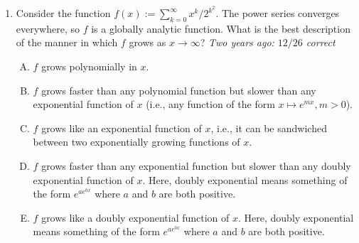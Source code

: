 \documentclass[10pt]{amsart}
\begin{document}
\begin{enumerate}
  \begin{enumerate}[(A)]
  \item If we start with any function in $C^\infty(\R)$ and take the
    Taylor series about $0$, the Taylor series converges everywhere on
    $\R$.
  \item If we start with any function in $C^\infty(\R)$ and take the
    Taylor series about $0$, the Taylor series converges to the
    original function on its interval of convergence (which may not be
    all of $\R$).
  \item If we start with a power series about $0$ that converges
    everywhere in $\R$, then the function it converges to is in
    $C^\infty(\R)$ and its Taylor series about $0$ equals the original
    power series.
  \item All of the above.
  \item None of the above.
  \end{enumerate}

  {\em Answer}: Option (C)

  {\em Explanation}: See the lecture notes. A counterexample to (A) is
  $\arctan$, and a counterexample to (B) is $e^{-1/x^2}$.

  {\em Performance review}: $17$ out of $24$ got this. $4$ chose (D),
  $2$ chose (B), $1$ chose (A).

  {\em Historical note (Math 153)}: $29$ out of $40$ got this. $6$ chose (D),
  $4$ chose (B), $1$ chose (A).

  {\em Historical note (last year)}: $9$ out of $11$ got this
  correct. $1$ chose (B) and $1$ chose (E).

  {\em Historical note (two years ago)}: $5$ out of $26$ people got this
  correct. $10$ chose (B), $5$ each chose (D) and (E), and $1$ chose
  (A).

\item Consider the function $f(x) := \sum_{k=0}^\infty
  x^k/2^{k^2}$. The power series converges everywhere, so $f$ is a
  globally analytic function. What is the best description of the
  manner in which $f$ grows as $x \to \infty$? {\em Two years ago: $12/26$
  correct}

  \begin{enumerate}[(A)]
  \item $f$ grows polynomially in $x$.
  \item $f$ grows faster than any polynomial function but slower than
    any exponential function of $x$ (i.e., any function of the form $x
    \mapsto e^{mx}, m >0$).
  \item $f$ grows like an exponential function of $x$, i.e., it can be
    sandwiched between two exponentially growing functions of $x$.
  \item $f$ grows faster than any exponential function but slower than
    any doubly exponential function of $x$. Here, doubly exponential
    means something of the form $e^{ae^{bx}}$ where $a$ and $b$ are
    both positive.
  \item $f$ grows like a doubly exponential function of $x$. Here,
    doubly exponential means something of the form $e^{ae^{bx}}$ where
    $a$ and $b$ are both positive.
  \end{enumerate}


\end{enumerate}
\end{document}
